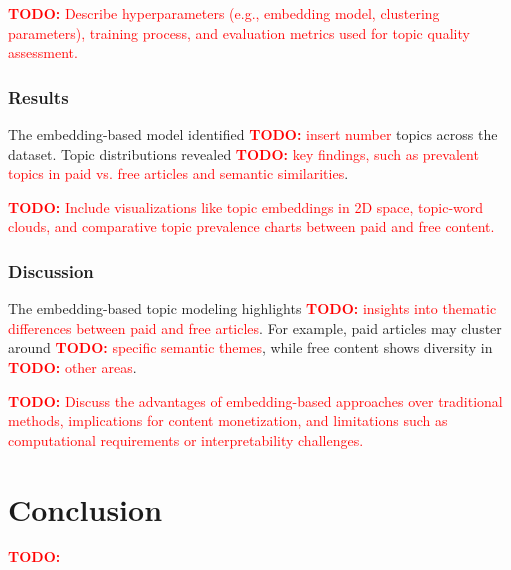\documentclass[11pt,a4paper]{article}
\newcommand{\todo}[1]{\textcolor{red}{\textbf{TODO:} #1}}
\begin{document}
\todo{Describe hyperparameters (e.g., embedding model, clustering parameters), training process, and evaluation metrics used for topic quality assessment.}

\subsubsection{Results}

The embedding-based model identified \todo{insert number} topics across the dataset. Topic distributions revealed \todo{key findings, such as prevalent topics in paid vs. free articles and semantic similarities}.

\todo{Include visualizations like topic embeddings in 2D space, topic-word clouds, and comparative topic prevalence charts between paid and free content.}

\subsubsection{Discussion}

The embedding-based topic modeling highlights \todo{insights into thematic differences between paid and free articles}. For example, paid articles may cluster around \todo{specific semantic themes}, while free content shows diversity in \todo{other areas}.

\todo{Discuss the advantages of embedding-based approaches over traditional methods, implications for content monetization, and limitations such as computational requirements or interpretability challenges.}



\section{Conclusion}

\todo{}



\end{document}
